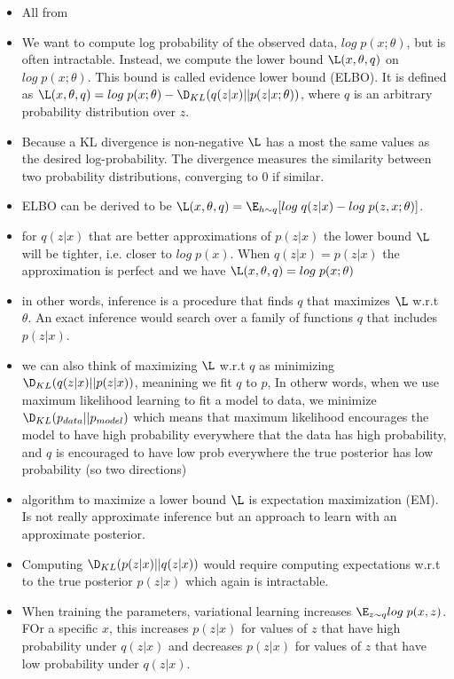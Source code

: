 \begin{itemize}
    \item All from \cite[Chp.~19]{Goodfellow-et-al-2016}
    \item We want to compute log probability of the observed data, $log \; p(x;\theta)$, but is often intractable. Instead, we compute the lower bound $\L(x,\theta, q)$ on $log\;p(x;\theta)$. This bound is called evidence lower bound (ELBO). It is defined as $\L(x,\theta,q) = log\;p(x;\theta)-\D_{KL}(q(z|x)||p(z|x;\theta))$, where $q$ is an arbitrary probability distribution over $z$.
    \item Because a KL divergence is non-negative $\L$ has a most the same values as the desired log-probability. The divergence measures the similarity between two probability distributions, converging to 0 if similar.
    \item ELBO can be derived to be $\L(x, \theta, q) = \E_{h \sim q}[log \; q(z|x) - log \; p(z,x;\theta)]$.
    \item for $q(z|x)$ that are better approximations of $p(z|x)$ the lower bound $\L$ will be tighter, i.e. closer to $log \; p(x)$. When $q(z|x) = p(z|x)$ the approximation is perfect and we have $\L(x,\theta,q) = log \;p(x;\theta)$
    \item in other words, inference is a procedure that finds $q$ that maximizes $\L$ w.r.t $\theta$. An exact inference would search over a family of functions $q$ that includes $p(z|x)$.
    \item we can also think of maximizing $\L$ w.r.t $q$ as minimizing $\D_{KL}(q(z|x)||p(z|x))$, meanining we fit $q$ to $p$, In otherw words, when we use maximum likelihood learning to fit a model to data, we minimize $\D_{KL}(p_{data}||p_{model})$ which means that maximum likelihood encourages the model to have high probability everywhere that the data has high probability, and $q$ is encouraged to have low prob everywhere the true posterior has low probability (so two directions)
    \item algorithm to maximize a lower bound $\L$ is expectation maximization (EM). Is not really approximate inference but an approach to learn with an approximate posterior.
    \item Computing $\D_{KL}(p(z|x)||q(z|x))$ would require computing expectations w.r.t to the true posterior $p(z|x)$ which again is intractable.
    \item When training the parameters, variational learning increases $\E_{z \sim q}log\; p(x,z)$. FOr a specific $x$, this increases $p(z|x)$ for  values of $z$ that have high probability under $q(z|x)$ and decreases $p(z|x)$ for values of $z$ that have low probability under $q(z|x)$.

\end{itemize}
